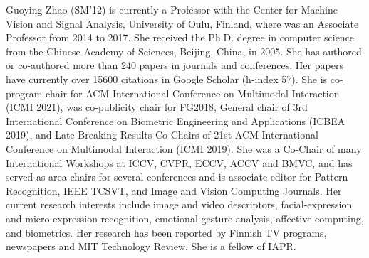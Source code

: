 \documentclass[10pt,journal,compsoc]{IEEEtran}
\begin{document}
	
\begin{IEEEbiography}{Guoying Zhao}
  (SM'12) is currently a Professor with the Center for Machine Vision and Signal Analysis, University of Oulu, Finland, where was an Associate Professor from 2014 to 2017. She received the Ph.D. degree in computer science from the Chinese Academy of Sciences, Beijing, China, in 2005. She has authored or co-authored more than 240 papers in journals and conferences. Her papers have currently over 15600 citations in Google Scholar (h-index 57). She is co-program chair for ACM International Conference on Multimodal Interaction (ICMI 2021), was co-publicity chair for FG2018, General chair of 3rd International Conference on Biometric Engineering and Applications (ICBEA 2019), and Late Breaking Results Co-Chairs of 21st ACM International Conference on Multimodal Interaction (ICMI 2019). She was a Co-Chair of many International Workshops at ICCV, CVPR, ECCV, ACCV and BMVC, and has served as area chairs for several conferences and is associate editor for Pattern Recognition, IEEE TCSVT, and Image and Vision Computing Journals. Her current research interests include image and video descriptors, facial-expression and micro-expression recognition, emotional gesture analysis, affective computing, and biometrics. Her research has been reported by Finnish TV programs, newspapers and MIT Technology Review. She is a fellow of IAPR.
\end{IEEEbiography}







\end{document}
